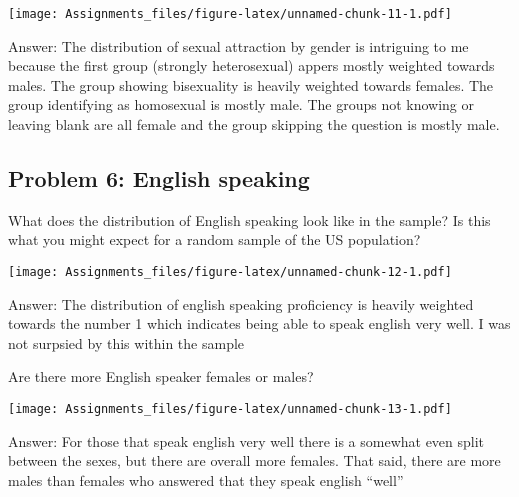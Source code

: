 \documentclass[
]{article}
\newenvironment{Shaded}{\begin{snugshade}}{\end{snugshade}}
\newcommand{\DataTypeTok}[1]{\textcolor[rgb]{0.13,0.29,0.53}{#1}}
\newcommand{\KeywordTok}[1]{\textcolor[rgb]{0.13,0.29,0.53}{\textbf{#1}}}
\newcommand{\NormalTok}[1]{#1}
\newcommand{\OperatorTok}[1]{\textcolor[rgb]{0.81,0.36,0.00}{\textbf{#1}}}
\newcommand{\OtherTok}[1]{\textcolor[rgb]{0.56,0.35,0.01}{#1}}
\newcommand{\StringTok}[1]{\textcolor[rgb]{0.31,0.60,0.02}{#1}}
\begin{document}
\texttt{[image: Assignments\_files/figure-latex/unnamed-chunk-11-1.pdf]}

Answer: The distribution of sexual attraction by gender is intriguing to
me because the first group (strongly heterosexual) appers mostly
weighted towards males. The group showing bisexuality is heavily
weighted towards females. The group identifying as homosexual is mostly
male. The groups not knowing or leaving blank are all female and the
group skipping the question is mostly male.

\hypertarget{problem-6-english-speaking}{%
\subsection{Problem 6: English
speaking}\label{problem-6-english-speaking}}

What does the distribution of English speaking look like in the sample?
Is this what you might expect for a random sample of the US population?

\begin{Shaded}
\end{Shaded}

\texttt{[image: Assignments\_files/figure-latex/unnamed-chunk-12-1.pdf]}

Answer: The distribution of english speaking proficiency is heavily
weighted towards the number 1 which indicates being able to speak
english very well. I was not surpsied by this within the sample

Are there more English speaker females or males?

\begin{Shaded}
\end{Shaded}

\texttt{[image: Assignments\_files/figure-latex/unnamed-chunk-13-1.pdf]}

Answer: For those that speak english very well there is a somewhat even
split between the sexes, but there are overall more females. That said,
there are more males than females who answered that they speak english
``well''
\end{document}
